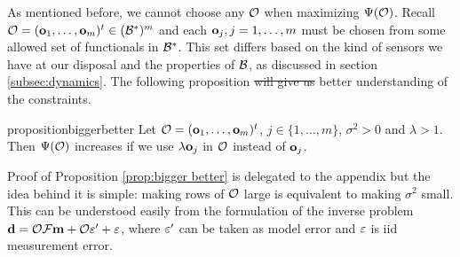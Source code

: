 \documentclass{amsart}
\numberwithin{equation}{section}
\providecommand{\DIFadd}[1]{{\protect\color{blue}\uwave{#1}}} %
\providecommand{\DIFdel}[1]{{\protect\color{red}\sout{#1}}}                      %
\providecommand{\DIFaddbegin}{} %
\providecommand{\DIFaddend}{} %
\providecommand{\DIFdelbegin}{} %
\providecommand{\DIFdelend}{} %
\begin{document}
As mentioned before, we cannot choose any $\mathcal{O}$ when maximizing
$\Psi(\mathcal{O})$. Recall \DIFdelbegin \DIFdel{$\mathcal{O} = (\mathbf{o}_1,\dots,\mathbf{o}_m)^t \in (\mathcal{B}^*)^m$
}\DIFdelend \DIFaddbegin \DIFadd{$\obs = (\meas_1,\dots,\meas_m)^t \in
(\hilo^*)^m$ }\DIFaddend and each $\mathbf{o}_j,j=1,\dots,m$ must be chosen from some
allowed set of functionals in \DIFdelbegin \DIFdel{$\mathcal{B}^*$}\DIFdelend \DIFaddbegin \DIFadd{$\hilo^*$}\DIFaddend . This set differs based on the
kind of sensors we have at our disposal and the properties of \DIFdelbegin \DIFdel{$\mathcal{B}$}\DIFdelend \DIFaddbegin \DIFadd{$\hilo$}\DIFaddend ,
as discussed in section \ref{subsec:dynamics}. The following
proposition \DIFdelbegin \DIFdel{will give us
}\DIFdelend \DIFaddbegin \DIFadd{gives }\DIFaddend better understanding of the constraints.
\DIFdelbegin %
\DIFdelend \DIFaddbegin \begin{restatable*}{proposition}{biggerbetter}\label{prop:bigger better}
  Let $\mathcal{O} = (\mathbf{o}_1,\dots,\mathbf{o}_m)^t$, $j \in \{1,\dots,m\}$, $\sigma^2
  > 0$ and $\lambda > 1$. Then $\Psi(\mathcal{O})$ increases if we use
  $\lambda \mathbf{o}_j$ in $\mathcal{O}$ instead of $\mathbf{o}_j$.
\end{restatable*}
\DIFaddend Proof of Proposition \ref{prop:bigger better} is delegated to the
appendix but the idea behind it is simple: making rows of $\mathcal{O}$ large
is equivalent to making $\sigma^2$ small. %
This can be understood easily from the formulation of the inverse
problem $\mathbf{d} = \mathcal{O} \mathcal{F} \mathbf{m} + \mathcal{O} \varepsilon' + \varepsilon$, where $\varepsilon'$
can be taken as model error and $\varepsilon$ is iid measurement error.
\end{document}

